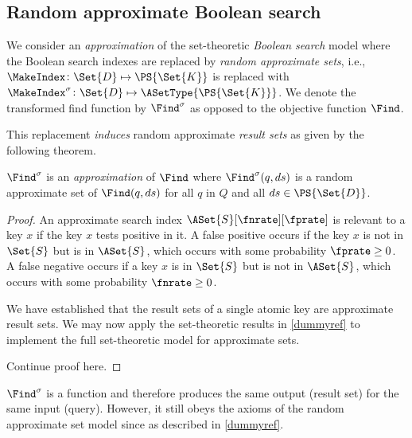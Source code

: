 \documentclass[ ../main.tex]{subfiles}
\begin{document}
%
%

\subsection{Random approximate Boolean search}
We consider an \emph{approximation} of the set-theoretic \emph{Boolean search} model where the Boolean search indexes are replaced by \emph{random approximate sets}, i.e., $\MakeIndex \colon \Set{D} \mapsto \PS{\Set{K}}$ is replaced with $\MakeIndex^{\sigma} \colon \Set{D} \mapsto \ASetType{\PS{\Set{K}}}$.
We denote the transformed find function by $\Find^\sigma$ as opposed to the objective function $\Find$.

This replacement \emph{induces} random approximate \emph{result sets} as given by the following theorem.
\begin{theorem}
$\Find^\sigma$ is an \emph{approximation} of $\Find$ where $\Find^\sigma(q,ds)$ is a random approximate set of $\Find(q,ds)$ for all $q$ in $Q$ and all $ds \in \PS{\Set{D}}$.
\end{theorem}
\begin{proof}
An approximate search index $\ASet{S}[\fnrate][\fprate]$ is relevant to a key $x$ if the key $x$ tests positive in it.
A false positive occurs if the key $x$ is not in $\Set{S}$ but is in $\ASet{S}$, which occurs with some probability $\fprate \geq 0$.
A false negative occurs if a key $x$ is in $\Set{S}$ but is not in $\ASet{S}$, which occurs with some probability $\fnrate \geq 0$.

We have established that the result sets of a single atomic key are approximate result sets. We may now apply the set-theoretic results in \cref{dummyref} to implement the full set-theoretic model for approximate sets.

Continue proof here.
\end{proof}

$\Find^\sigma$ is a function and therefore produces the same output (result set) for the same input (query).
However, it still obeys the axioms of the random approximate set model since as described in \cref{dummyref}. 
\end{document}
